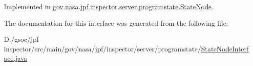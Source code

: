 Implemented in \hyperlink{classgov_1_1nasa_1_1jpf_1_1inspector_1_1server_1_1programstate_1_1_state_node_a54c1c8d91f93c078171589f844252bdf}{gov.\+nasa.\+jpf.\+inspector.\+server.\+programstate.\+State\+Node}.



The documentation for this interface was generated from the following file\+:\begin{DoxyCompactItemize}
\item 
D\+:/gsoc/jpf-\/inspector/src/main/gov/nasa/jpf/inspector/server/programstate/\hyperlink{_state_node_interface_8java}{State\+Node\+Interface.\+java}\end{DoxyCompactItemize}
